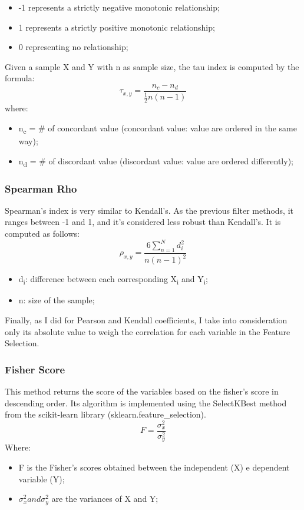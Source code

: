 \begin{itemize}
\item -1 represents a strictly negative monotonic relationship;
\item 1 represents a strictly positive monotonic relationship;
\item 0 representing no relationship;
\end{itemize}
Given a sample X and Y with n as sample size, the tau index is computed by the formula:
\begin{equation}
  \tau_{x,y} = \frac{n_c-n_d}{\frac{1}{2}n(n-1)}
\end{equation}
where:
\begin{itemize}
\item n\textsubscript{c} = \# of concordant value (concordant value: value are ordered in the same way);
\item n\textsubscript{d} = \# of discordant value (discordant value: value are ordered differently);
\end{itemize}
\subsubsection{Spearman Rho}
Spearman’s index is very similar to Kendall’s. As the previous filter methods, it ranges between -1 and 1, and it's considered less robust than Kendall's.
It is computed as follows:
\begin{equation}
\rho_{x,y} = \frac{6\sum_{n=1}^{N} d_i^2}{n(n-1)^2}
\end{equation}
\begin{itemize}
\item d\textsubscript{i}: difference between each corresponding X\textsubscript{i} and Y\textsubscript{i};
\item n: size of the sample;
\end{itemize}

Finally, as I did for Pearson and Kendall coefficients, I take into consideration only its absolute value to weigh the correlation for each variable in the Feature Selection.

\subsubsection{Fisher Score}
This method returns the score of the variables based on the fisher’s score in descending order. \newline
Its algorithm is implemented using the SelectKBest method from the scikit-learn library (sklearn.feature\_selection).\newline
\begin{equation}
F = \frac{\sigma_x^2}{\sigma_y^2}
\end{equation}
Where:
\begin{itemize}
\item F is the Fisher's scores obtained between the independent (X) e dependent variable (Y);
    \item $\sigma_x^2 and\sigma_y^2$ are the variances of X and Y;
\end{itemize}
\pagebreak
